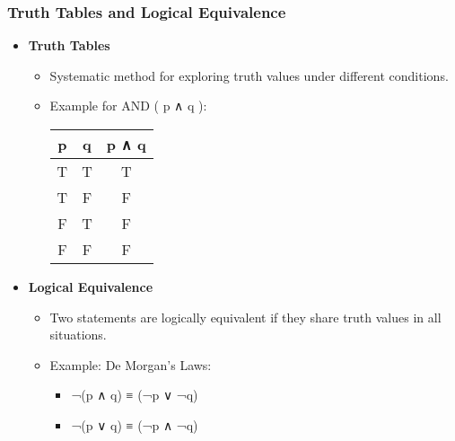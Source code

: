 \documentclass[aspectratio=169]{beamer}
\begin{document}
\begin{frame}[fragile]
    \frametitle{Truth Tables and Logical Equivalence}
    \begin{itemize}
        \item \textbf{Truth Tables}
        \begin{itemize}
            \item Systematic method for exploring truth values under different conditions.
            \item Example for AND ( p ∧ q ):
            \begin{center}
                \begin{tabular}{|c|c|c|}
                    \hline
                    p & q & p ∧ q \\
                    \hline
                    T & T & T \\
                    T & F & F \\
                    F & T & F \\
                    F & F & F \\
                    \hline
                \end{tabular}
            \end{center}
        \end{itemize}

        \item \textbf{Logical Equivalence}
        \begin{itemize}
            \item Two statements are logically equivalent if they share truth values in all situations.
            \item Example: De Morgan's Laws:
            \begin{itemize}
                \item ¬(p ∧ q) ≡ (¬p ∨ ¬q)
                \item ¬(p ∨ q) ≡ (¬p ∧ ¬q)
            \end{itemize}
        \end{itemize}
    \end{itemize}
\end{frame}
\end{document}
